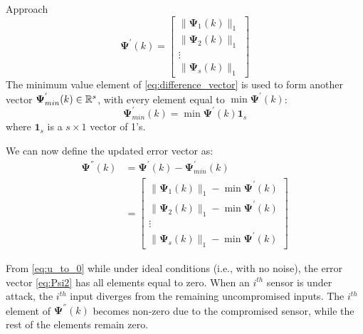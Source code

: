 \begin{section}{Approach}
    \begin{equation}
    \label{eq:difference_vector}
	\bm{\Psi^{'}}(k)=\begin{bmatrix} \lVert{\bm{\Psi}_1(k)}\rVert_1 \\ \lVert{\bm{\Psi}_2(k)}\rVert_1 \\ \vdots \\ \lVert{\bm{\Psi}_s(k)}\rVert_1 \end{bmatrix}
	\end{equation}
The minimum value element of \eqref{eq:difference_vector} is used to form another vector $\bm{\Psi}^{'}_{min}(k) \in \mathbb{R}^s$, with every element equal to $\min \bm{\Psi}^{'}(k)$:
    \begin{equation}
	\bm{\Psi}^{'}_{min}(k)=\min \bm{\Psi}^{'}(k){\bm{1}}_s
	\end{equation}
	where ${\bm{1}}_s$ is a $s\times1$ vector of 1's.

We can now define the updated error vector as:
    \begin{align}
    \label{eq:Psi2}
	\bm{\Psi}^{''}(k)&=\bm{\Psi}^{'}(k)-\bm{\Psi}^{'}_{min}(k) \\
	& =\begin{bmatrix} \lVert{\bm{\Psi}_1(k)}\rVert_1 - \min \bm{\Psi}^{'}(k)\\ \lVert{\bm{\Psi}_2(k)}\rVert_1 - \min \bm{\Psi}^{'}(k) \\ \vdots \\ \lVert{\bm{\Psi}_s(k)}\rVert_1 - \min \bm{\Psi}^{'}(k) \end{bmatrix}
	\end{align}
	
From \eqref{eq:u_to_0} while under ideal conditions (i.e., with no noise), the error vector \eqref{eq:Psi2} has all elements equal to zero. When an $i^{th}$ sensor is under attack, the $i^{th}$ input diverges from the remaining uncompromised inputs. The $i^{th}$ element of $\bm{\Psi}^{''}(k)$ becomes non-zero due to the compromised sensor, while the rest of the elements remain zero. 


\end{section}

